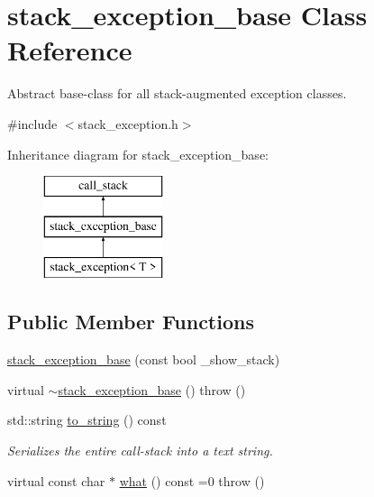 \hypertarget{classstacktrace_1_1stack__exception__base}{}\section{stack\+\_\+exception\+\_\+base Class Reference}
\label{classstacktrace_1_1stack__exception__base}


Abstract base-\/class for all stack-\/augmented exception classes.  




{\ttfamily \#include $<$stack\+\_\+exception.\+h$>$}

Inheritance diagram for stack\+\_\+exception\+\_\+base\+:\begin{figure}[H]
\begin{center}
\leavevmode
\includegraphics[height=3.000000cm]{classstacktrace_1_1stack__exception__base}
\end{center}
\end{figure}
\subsection*{Public Member Functions}
\begin{DoxyCompactItemize}
\item 
\mbox{\hyperlink{classstacktrace_1_1stack__exception__base_a76c136190eebc9baa852d2f1a7b12914}{stack\+\_\+exception\+\_\+base}} (const bool \+\_\+show\+\_\+stack)
\item 
virtual \mbox{\hyperlink{classstacktrace_1_1stack__exception__base_a4da8e685bb293b4ee7c90333e97e79e8}{$\sim$stack\+\_\+exception\+\_\+base}} ()  throw ()
\item 
std\+::string \mbox{\hyperlink{classstacktrace_1_1call__stack_aac993ecccd3d88aafefb6b8e3caa1dee}{to\+\_\+string}} () const
\begin{DoxyCompactList}\small\item\em Serializes the entire call-\/stack into a text string. \end{DoxyCompactList}\item 
virtual const char $\ast$ \mbox{\hyperlink{classstacktrace_1_1stack__exception__base_a926844cae0786e6c6192f557a12e39f0}{what}} () const =0  throw ()
\end{DoxyCompactItemize}

